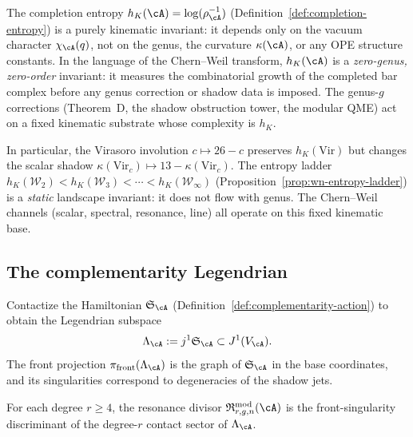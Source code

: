 \begin{remark}
\label{rem:entropy-genus-independent}
The completion entropy $h_K(\cA) = \log(\rho_\cA^{-1})$
(Definition~\ref{def:completion-entropy}) is a purely kinematic
invariant: it depends only on the vacuum character $\chi_\cA(q)$,
not on the genus, the curvature $\kappa(\cA)$, or any OPE
structure constants. In the language of the Chern--Weil transform,
$h_K(\cA)$ is a \emph{zero-genus, zero-order} invariant: it
measures the combinatorial growth of the completed bar complex
before any genus correction or shadow data is imposed. The
genus-$g$ corrections (Theorem~D, the shadow obstruction tower,
the modular QME) act on a fixed kinematic substrate whose
complexity is $h_K$.

In particular, the Virasoro involution $c \mapsto 26 - c$ preserves
$h_K(\mathrm{Vir})$ but changes the scalar shadow
$\kappa(\mathrm{Vir}_c) \mapsto 13 - \kappa(\mathrm{Vir}_c)$. The entropy ladder
$h_K(\mathcal{W}_2) < h_K(\mathcal{W}_3) < \cdots <
h_K(\mathcal{W}_\infty)$
(Proposition~\ref{prop:wn-entropy-ladder}) is a \emph{static}
landscape invariant: it does not flow with genus. The Chern--Weil
channels (scalar, spectral, resonance, line) all operate on this
fixed kinematic base.
\end{remark}

\subsection{The complementarity Legendrian}
\label{subsec:complementarity-legendrian}

\begin{definition}
\label{def:complementarity-legendrian}
Contactize the Hamiltonian $\mathfrak{S}_{\cA}$
(Definition~\ref{def:complementarity-action}) to obtain the
Legendrian subspace
\begin{equation}
\label{eq:complementarity-legendrian}
\Lambda_{\cA}
:= j^1\mathfrak{S}_{\cA}
\subset J^1(V_{\cA}).
\end{equation}
The front projection $\pi_{\mathrm{front}}(\Lambda_{\cA})$ is the
graph of $\mathfrak{S}_{\cA}$ in the base coordinates, and its
singularities correspond to degeneracies of the shadow jets.
\end{definition}

\begin{conjecture}
\label{conj:front-discriminant-resonance}
\ClaimStatusConjectured
For each degree $r \geq 4$, the resonance divisor
$\mathfrak{R}^{\mathrm{mod}}_{r,g,n}(\cA)$ is the
front-singularity discriminant of the degree-$r$ contact sector of
$\Lambda_{\cA}$.
\end{conjecture}


